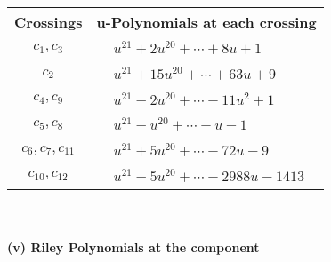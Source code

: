 \documentclass[1p]{elsarticle_modified}
\theoremstyle{definition}
\begin{document}
\begin{tabular}{m{50pt}|m{274pt}}
Crossings & \hspace{64pt}u-Polynomials at each crossing \\
\hline $$\begin{aligned}c_{1},c_{3}\end{aligned}$$&$\begin{aligned}
&u^{21}+2 u^{20}+\cdots+8 u+1
\end{aligned}$\\
\hline $$\begin{aligned}c_{2}\end{aligned}$$&$\begin{aligned}
&u^{21}+15 u^{20}+\cdots+63 u+9
\end{aligned}$\\
\hline $$\begin{aligned}c_{4},c_{9}\end{aligned}$$&$\begin{aligned}
&u^{21}-2 u^{20}+\cdots-11 u^2+1
\end{aligned}$\\
\hline $$\begin{aligned}c_{5},c_{8}\end{aligned}$$&$\begin{aligned}
&u^{21}- u^{20}+\cdots- u-1
\end{aligned}$\\
\hline $$\begin{aligned}c_{6},c_{7},c_{11}\end{aligned}$$&$\begin{aligned}
&u^{21}+5 u^{20}+\cdots-72 u-9
\end{aligned}$\\
\hline $$\begin{aligned}c_{10},c_{12}\end{aligned}$$&$\begin{aligned}
&u^{21}-5 u^{20}+\cdots-2988 u-1413
\end{aligned}$\\
\hline
\end{tabular}\\~\\
\newpage\renewcommand{\arraystretch}{1}
\flushleft \textbf{(v) Riley Polynomials at the component}\newline \\
\end{document}
